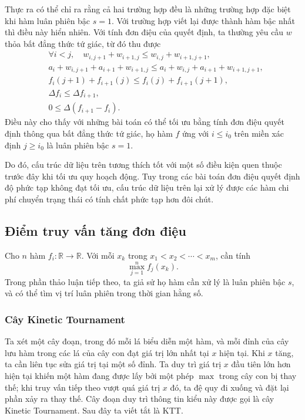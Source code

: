 \documentclass[11pt]{article}
\begin{document}
Thực ra có thể chỉ ra rằng cả hai trường hợp đều là những trường hợp đặc biệt
khi hàm luân phiên bậc \(s=1\). Với trường hợp viết lại được thành hàm bậc nhất
thì điều này hiển nhiên. Với tính đơn điệu của quyết định, ta thường yêu cầu
\(w\) thỏa bất đẳng thức tứ giác, từ đó thu được
\[
\begin{aligned}
&\forall i<j,\quad w_{i,j+1}+w_{i+1,j}\le w_{i,j}+w_{i+1,j+1},\\
&a_i+w_{i,j+1}+a_{i+1}+w_{i+1,j}
  \le a_i+w_{i,j}+a_{i+1}+w_{i+1,j+1},\\
&f_i(j+1)+f_{i+1}(j)\le f_i(j)+f_{i+1}(j+1),\\
&\Delta f_i\le \Delta f_{i+1},\\
&0\le \Delta(f_{i+1}-f_i).
\end{aligned}
\]
Điều này cho thấy với những bài toán có thể tối ưu bằng tính đơn điệu quyết
định thông qua bất đẳng thức tứ giác, họ hàm \(f\) ứng với \(i\le i_0\) trên
miền xác định \(j\ge i_0\) là luân phiên bậc \(s=1\).

Do đó, cấu trúc dữ liệu trên tương thích tốt với một số điều kiện quen thuộc
trước đây khi tối ưu quy hoạch động. Tuy trong các bài toán đơn điệu quyết định
độ phức tạp không đạt tối ưu, cấu trúc dữ liệu trên lại xử lý được các hàm chi
phí chuyển trạng thái có tính chất phức tạp hơn đôi chút.

\subsection{Điểm truy vấn tăng đơn điệu}

Cho \(n\) hàm \(f_i:\mathbb{R}\to\mathbb{R}\). Với mỗi
\(x_k\) trong \(x_1<x_2<\cdots<x_m\), cần tính
\[
  \max_{j=1}^n f_j(x_k).
\]
Trong phần thảo luận tiếp theo, ta giả sử họ hàm cần xử lý là luân phiên bậc
\(s\), và có thể tìm vị trí luân phiên trong thời gian hằng số.

\subsubsection{Cây Kinetic Tournament}

Ta xét một cây đoạn, trong đó mỗi lá biểu diễn một hàm, và mỗi đỉnh của cây lưu
hàm trong các lá của cây con đạt giá trị lớn nhất tại \(x\) hiện tại. Khi \(x\)
tăng, ta cần liên tục sửa giá trị tại một số đỉnh. Ta duy trì giá trị \(x\) đầu
tiên lớn hơn hiện tại khiến một hàm đang được lấy bởi một phép \(\max\) trong
cây con bị thay thế; khi truy vấn tiếp theo vượt quá giá trị \(x\) đó, ta đệ quy
đi xuống và đặt lại phần xảy ra thay thế. Cây đoạn duy trì thông tin kiểu này
được gọi là cây Kinetic Tournament. Sau đây ta viết tắt là KTT.
\end{document}
